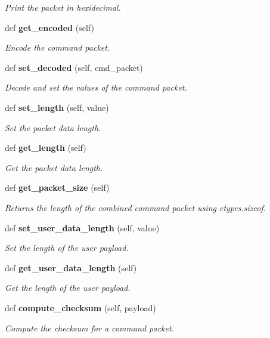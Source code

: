 \begin{DoxyCompactItemize}
\begin{DoxyCompactList}\small\item\em Print the packet in hexidecimal. \end{DoxyCompactList}\item 
def {\bf get\+\_\+encoded} (self)
\begin{DoxyCompactList}\small\item\em Encode the command packet. \end{DoxyCompactList}\item 
def {\bf set\+\_\+decoded} (self, cmd\+\_\+packet)
\begin{DoxyCompactList}\small\item\em Decode and set the values of the command packet. \end{DoxyCompactList}\item 
def {\bf set\+\_\+length} (self, value)
\begin{DoxyCompactList}\small\item\em Set the packet data length. \end{DoxyCompactList}\item 
def {\bf get\+\_\+length} (self)
\begin{DoxyCompactList}\small\item\em Get the packet data length. \end{DoxyCompactList}\item 
def {\bf get\+\_\+packet\+\_\+size} (self)
\begin{DoxyCompactList}\small\item\em Returns the length of the combined command packet using ctypes.\+sizeof. \end{DoxyCompactList}\item 
def {\bf set\+\_\+user\+\_\+data\+\_\+length} (self, value)
\begin{DoxyCompactList}\small\item\em Set the length of the user payload. \end{DoxyCompactList}\item 
def {\bf get\+\_\+user\+\_\+data\+\_\+length} (self)
\begin{DoxyCompactList}\small\item\em Get the length of the user payload. \end{DoxyCompactList}\item 
def {\bf compute\+\_\+checksum} (self, payload)
\begin{DoxyCompactList}\small\item\em Compute the checksum for a command packet. \end{DoxyCompactList}\item 

\end{DoxyCompactItemize}
